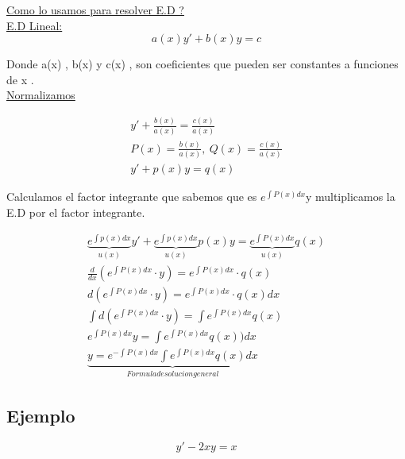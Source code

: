 \documentclass{article}
\begin{document}
\underline{Como lo usamos para resolver E.D ?} \\
\underline{E.D Lineal:} 
\begin{equation}
a(x)y' + b(x)y = c
\end{equation}

Donde a(x) , b(x) y c(x) , son coeficientes que pueden ser constantes a funciones de x .\\

\underline{Normalizamos}

\begin{eqnarray}
\nonumber y' +\frac{b(x)}{a(x)} = \frac{c(x)}{a(x)}\\
\nonumber P(x) = \frac{b(x)}{a(x)}, \  Q(x) = \frac{c(x)}{a(x)} \\
\nonumber y' + p(x)y =q(x)
\end{eqnarray}

Calculamos el factor integrante que sabemos que es $e^{\int P(x) dx}$y multiplicamos la E.D por el factor integrante.


\begin{eqnarray}
\nonumber \underbrace{e^{\int p(x) dx}}_{u(x)}y' + \underbrace{e^{\int p(x) dx}}_{u(x)} p(x)y = \underbrace{e^{\int P(x) dx}}_{u(x)}q(x) \\
\nonumber \frac{d}{dx}\left(e^{\int P(x) dx} \cdot y \right) = e^{\int P(x) dx} \cdot q(x)\\
\nonumber d\left(e^{\int P(x) dx} \cdot y \right) = e^{\int P(x) dx} \cdot q(x) dx\\
\nonumber \int d \left( e^{\int P(x) dx} \cdot y \right) = \int e^{\int P(x) dx} q(x) \\
\nonumber e^{\int P(x) dx} y = \int e^{\int P(x) dx} q(x)) dx \\
\nonumber \underbrace{y = e^{- \int P(x) dx} \int e^{\int P(x) dx}  q(x) dx}_{Formula de solucion general}
\end{eqnarray}


\subsection{Ejemplo}

\begin{equation}
y'- 2xy = x
\end{equation}
\end{document}
